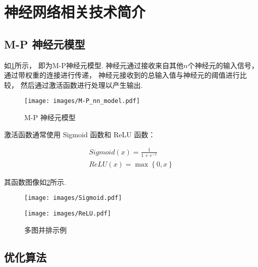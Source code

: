 \section{神经网络相关技术简介}

\subsection{M-P 神经元模型}

如\cref{fig:M-P}所示，
即为M-P神经元模型.
神经元通过接收来自其他$n$个神经元的输入信号，
通过带权重的连接进行传递，
神经元接收到的总输入值与神经元的阈值进行比较，
然后通过激活函数进行处理以产生输出\cite{zhouzhihuaJiQiXueXi}.

\begin{figure}[!htbp]
    \centering
    \texttt{[image: images/M-P\_nn\_model.pdf]}
    \caption{M-P 神经元模型}\label{fig:M-P}
\end{figure}

激活函数通常使用 Sigmoid 函数和 ReLU 函数：

\begin{equation}
    \label{eq:sigmoid}
    \begin{aligned}
        Sigmoid\left(x\right) = \frac{1}{1+e^{-x}} \\
        ReLU\left(x\right) = \max\left\{0, x\right\}
    \end{aligned}
\end{equation}

其函数图像如\cref{fig:active-func}所示.

\begin{figure}
    \centering
    \begin{minipage}[b]{0.45\textwidth}
        \centering
        \texttt{[image: images/Sigmoid.pdf]}
        \label{fig:sigmoid}
    \end{minipage}
    \begin{minipage}[b]{0.45\textwidth}
        \centering
        \texttt{[image: images/ReLU.pdf]}
        \label{fig:ReLu}
    \end{minipage}
    \caption{多图并排示例}
    \label{fig:active-func}
\end{figure}

\subsection{优化算法}


